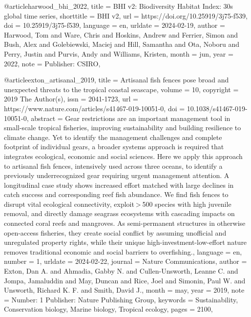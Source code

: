 {{{{@article{harwood_bhi_2022,
	title = {{BHI} v2: {Biodiversity} {Habitat} {Index}: 30s global time series},
	shorttitle = {{BHI} v2},
	url = {https://doi.org/10.25919/3j75-f539},
	doi = {10.25919/3j75-f539},
	language = {en},
	urldate = {2024-02-19},
	author = {Harwood, Tom and Ware, Chris and Hoskins, Andrew and Ferrier, Simon and Bush, Alex and Golebiewski, Maciej and Hill, Samantha and Ota, Noboru and Perry, Justin and Purvis, Andy and Williams, Kristen},
	month = jun,
	year = {2022},
	note = {Publisher: CSIRO},
}

@article{exton_artisanal_2019,
	title = {Artisanal fish fences pose broad and unexpected threats to the tropical coastal seascape},
	volume = {10},
	copyright = {2019 The Author(s)},
	issn = {2041-1723},
	url = {https://www.nature.com/articles/s41467-019-10051-0},
	doi = {10.1038/s41467-019-10051-0},
	abstract = {Gear restrictions are an important management tool in small-scale tropical fisheries, improving sustainability and building resilience to climate change. Yet to identify the management challenges and complete footprint of individual gears, a broader systems approach is required that integrates ecological, economic and social sciences. Here we apply this approach to artisanal fish fences, intensively used across three oceans, to identify a previously underrecognized gear requiring urgent management attention. A longitudinal case study shows increased effort matched with large declines in catch success and corresponding reef fish abundance. We find fish fences to disrupt vital ecological connectivity, exploit {\textgreater} 500 species with high juvenile removal, and directly damage seagrass ecosystems with cascading impacts on connected coral reefs and mangroves. As semi-permanent structures in otherwise open-access fisheries, they create social conflict by assuming unofficial and unregulated property rights, while their unique high-investment-low-effort nature removes traditional economic and social barriers to overfishing.},
	language = {en},
	number = {1},
	urldate = {2024-02-22},
	journal = {Nature Communications},
	author = {Exton, Dan A. and Ahmadia, Gabby N. and Cullen-Unsworth, Leanne C. and Jompa, Jamaluddin and May, Duncan and Rice, Joel and Simonin, Paul W. and Unsworth, Richard K. F. and Smith, David J.},
	month = may,
	year = {2019},
	note = {Number: 1
Publisher: Nature Publishing Group},
	keywords = {Sustainability, Conservation biology, Marine biology, Tropical ecology},
	pages = {2100},
}

}}}}
